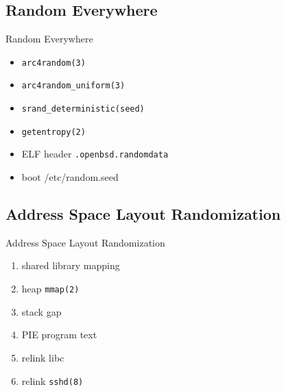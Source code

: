 \documentclass[14pt,aspectratio=169]{beamer}
\begin{document}
\subsection{Random Everywhere}
\begin{frame}{Random Everywhere}
\begin{itemize}
  \item \texttt{arc4random(3)}
  \item \texttt{arc4random\_uniform(3)}
  \item \texttt{srand\_deterministic(seed)}
  \item \texttt{getentropy(2)}
  \item ELF header \texttt{.openbsd.randomdata}
  \item boot /etc/random.seed
\end{itemize}
\end{frame}

\subsection{Address Space Layout Randomization}
\begin{frame}{Address Space Layout Randomization}
\begin{enumerate}
  \item shared library mapping
  \item heap \texttt{mmap(2)}
  \item stack gap
  \item PIE program text
  \item relink libc
  \item relink \texttt{sshd(8)}
\end{enumerate}
\end{frame}
\end{document}
